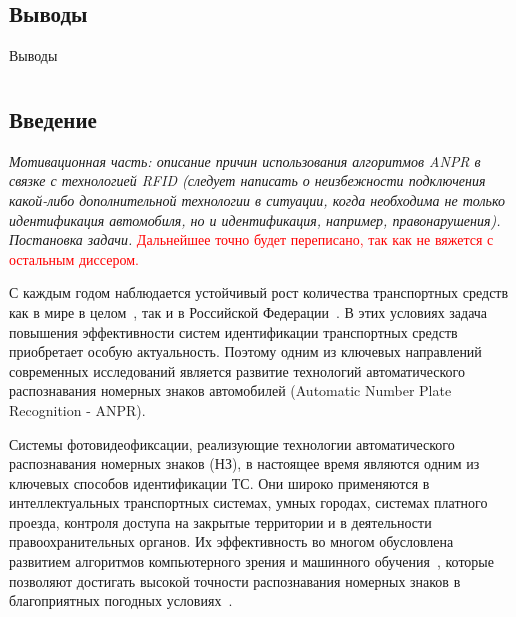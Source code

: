 \documentclass[12pt]{article}
\theoremstyle{definition}
\begin{document}
\clearpage

\subsection*{Выводы}

Выводы

\pagebreak

\section{}
\subsection{Введение}
\textit{Мотивационная часть: описание причин использования алгоритмов ANPR в связке с технологией RFID (следует написать о неизбежности подключения какой-либо дополнительной технологии в ситуации, когда необходима не только идентификация автомобиля, но и идентификация, например, правонарушения). Постановка задачи.}
\textcolor{red}{Дальнейшее точно будет переписано, так как не вяжется с остальным диссером.}

С каждым годом наблюдается устойчивый рост количества транспортных средств как в мире в целом~\cite{Sakulieva2019auto}, так и в Российской Федерации~\cite{Shaihov2024analys}. В этих условиях задача повышения эффективности систем идентификации транспортных средств приобретает особую актуальность. Поэтому одним из ключевых направлений современных исследований является развитие технологий автоматического распознавания номерных знаков автомобилей (Automatic Number Plate Recognition - ANPR).

Системы фотовидеофиксации, реализующие технологии автоматического распознавания номерных знаков (НЗ), в настоящее время являются одним из ключевых способов идентификации ТС. Они широко применяются в интеллектуальных транспортных системах, умных городах, системах платного проезда, контроля доступа на закрытые территории и в деятельности правоохранительных органов. Их эффективность во многом обусловлена развитием алгоритмов компьютерного зрения и машинного обучения~\cite{Kumawat2023, Sonnara2025, Upadhye2025}, которые позволяют достигать высокой точности распознавания номерных знаков в благоприятных погодных условиях~\cite{lubna2021automatic}.
\end{document}

